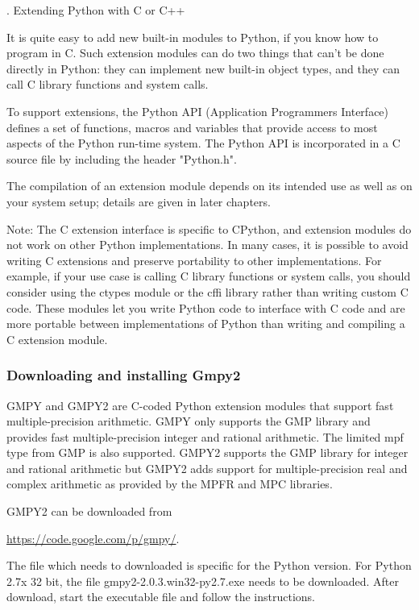 . Extending Python with C or C++

It is quite easy to add new built-in modules to Python, if you know how to program in C. Such extension modules can do two things that can’t be done directly in Python: they can implement new built-in object types, and they can call C library functions and system calls.

To support extensions, the Python API (Application Programmers Interface) defines a set of functions, macros and variables that provide access to most aspects of the Python run-time system. The Python API is incorporated in a C source file by including the header "Python.h".

The compilation of an extension module depends on its intended use as well as on your system setup; details are given in later chapters.

Note:
The C extension interface is specific to CPython, and extension modules do not work on other Python implementations. In many cases, it is possible to avoid writing C extensions and preserve portability to other implementations. For example, if your use case is calling C library functions or system calls, you should consider using the ctypes module or the cffi library rather than writing custom C code. These modules let you write Python code to interface with C code and are more portable between implementations of Python than writing and compiling a C extension module.


\subsubsection{Downloading and installing Gmpy2}

GMPY and GMPY2 are C-coded Python extension modules that support fast multiple-precision arithmetic. GMPY only supports the GMP library and provides fast multiple-precision integer and rational arithmetic. The limited mpf type from GMP is also supported. GMPY2 supports the GMP library for integer and rational arithmetic but GMPY2 adds support for multiple-precision real and complex arithmetic as provided by the MPFR and MPC libraries. 

GMPY2 can be downloaded from

\vpara
\href{https://code.google.com/p/gmpy/}{https://code.google.com/p/gmpy/}.

The file which needs to downloaded is specific for the Python version. For Python 2.7x 32 bit, the file gmpy2-2.0.3.win32-py2.7.exe needs to be downloaded. After download, start the executable file and follow the instructions.

